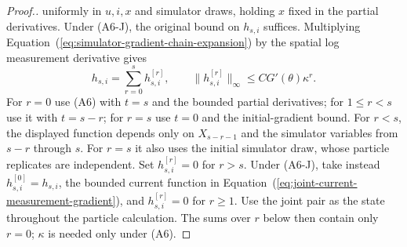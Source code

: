 \documentclass[11pt]{article}
\theoremstyle{thmstylethree}%
\begin{document}
\begin{proof}[Proof.]
{uniformly in $u,i,x$ and simulator draws, holding $x$ fixed in the
partial derivatives. Under (A6-J), the original bound on $h_{s,i}$ suffices.
Multiplying Equation~(\ref{eq:simulator-gradient-chain-expansion}) by
the spatial log measurement derivative gives
\begin{equation}
h_{s,i}=\sum_{r=0}^s h_{s,i}^{[r]},
\qquad
\|h_{s,i}^{[r]}\|_\infty\leq CG'(\theta)\kappa^r.
\label{eq:measurement-gradient-age-sum}
\end{equation}
For $r=0$ use (A6) with $t=s$ and the bounded partial derivatives;
for $1\leq r<s$ use it with $t=s-r$; for $r=s$ use $t=0$ and the
initial-gradient bound. For $r<s$, the displayed function depends only
on $X_{s-r-1}$ and the simulator variables from $s-r$ through $s$.
For $r=s$ it also uses the initial simulator draw, whose particle
replicates are independent. Set $h_{s,i}^{[r]}=0$ for $r>s$.
\endgraf
Under (A6-J), take instead $h_{s,i}^{[0]}=h_{s,i}$, the bounded current
function in Equation~(\ref{eq:joint-current-measurement-gradient}), and
$h_{s,i}^{[r]}=0$ for $r\geq1$. Use the joint pair as the state throughout
the particle calculation. The sums over $r$ below then contain only
$r=0$; $\kappa$ is needed only under (A6).}


\end{proof}
\end{document}
